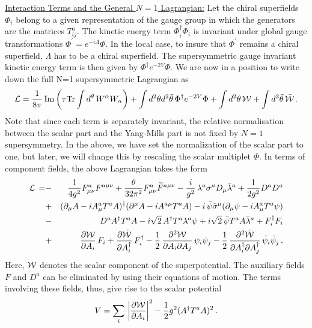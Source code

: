 \noindent\underline{Interaction Terms and the General $N=1$
  Lagrangian:}
Let the chiral superfields $\Phi_i$ belong to a given
representation of the gauge group in which the generators are
the matrices $T^a_{ij}$. The kinetic energy term
$\Phi_i^\dagger\Phi_i$ is invariant under global gauge transformations
$\Phi^\prime=e^{-i\Lambda} \Phi$. In the local case, to insure that
$\Phi^\prime$ remains a chiral superfield, $\Lambda$ has to be a
chiral superfield. The supersymmetric gauge invariant kinetic energy
term is then given by  $\Phi^\dagger e^{-2V}\Phi$. We are now in a
position to write down the full N=1 supersymmetric Lagrangian as 
\begin{equation}
{\cal L}=\frac{1}{8\pi}\,{\rm Im}\left(\tau{\rm Tr}\int d^\theta
\,W^\alpha W_\alpha \right)+\int d^2\theta d^2\bar\theta\,\Phi^\dagger 
e^{-2V}\Phi+ \int d^2\theta\,{\cal W}+\int d^2\bar\theta\,\bar{\cal W}\,.     
\label{fullSF}
\end{equation}
Note that since each term is separately invariant, the relative
normalisation between the scalar part and the Yang-Mills part is
not fixed by $N=1$ supersymmetry. In the above, we have set the
normalization of the scalar part to one, but later, we will change
this by rescaling the scalar multiplet $\Phi$. In terms of component
fields, the above Lagrangian takes the form  
\begin{eqnarray}
{\cal L}\,=&-&\frac{1}{4g^2}F^a_{\mu\nu}F^{a\mu\nu}+\frac{\theta} 
{32\pi^2}F^a_{\mu\nu}\widetilde F^{a\mu\nu}
-\frac{i}{g^2} \,\lambda^a \sigma^\mu D_\mu \bar{\lambda}^a 
+\frac{1}{2g^2}D^a D^a  \nonumber\\
&+& (\partial_\mu A-iA^a_\mu T^a A)^\dagger(\partial^\mu A-iA^{a\mu} 
T^a A) -i\,\bar{\psi} 
\bar{\sigma}^\mu (\partial_\mu\psi -iA^a_\mu T^a \psi)\nonumber\\
&-& D^a A^\dagger T^a A -i\sqrt{2}\,A^\dagger T^a \lambda^a
\psi+i\sqrt{2}\, \bar{\psi} T^a A \bar{\lambda}^a + F^\dagger_i F_i
\nonumber\\ 
&+&\frac{\partial {\cal W}}{\partial A_i} \, F_{i} +
\frac{\partial \bar{\cal W}}{\partial A^\dagger_i} \, F^\dagger_{i} -
\frac{1}{2}\,\frac{\partial^2 {\cal W}}{\partial A_i\partial A_j}\,
\psi_{i}\psi_{j}-\frac{1}{2}\,\frac{\partial^2 \bar{\cal W}} 
{\partial A_i^\dagger\partial
  A_j^\dagger}\,\bar{\psi}_{i}\bar{\psi}_{j}\,. 
\label{fullC}
\end{eqnarray}
Here, ${\cal W}$ denotes the scalar component of the superpotential.
The auxiliary fields $F$ and $D^a$ can be eliminated by using their
equations of motion. The terms involving these fields, thus, give rise 
to the scalar potential  
\begin{equation}
V = \sum_i\,\left|\frac{\partial{\cal W}}{\partial A_i}\right|^2
-\frac{1}{2} g^2 (A^\dagger T^a A)^2\,.
\label{Spot}
\end{equation}
